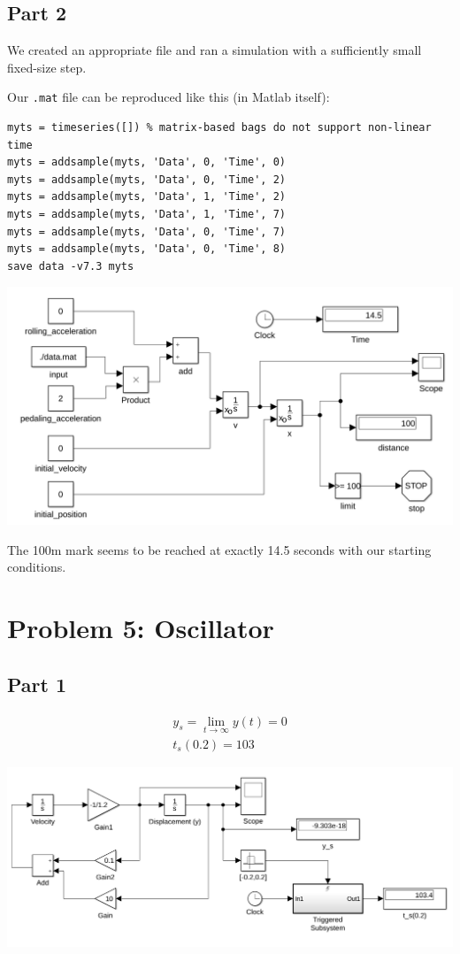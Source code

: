\documentclass[a4paper,parskip,headheight=38pt]{scrartcl} %
\begin{document}
\subsection*{Part 2}

We created an appropriate file and ran a simulation with a sufficiently
small fixed-size step.

\pagebreak{}
Our \texttt{.mat} file can be reproduced like this (in Matlab itself):
%
\vspace{-\baselineskip}\begin{verbatim}
myts = timeseries([]) % matrix-based bags do not support non-linear time
myts = addsample(myts, 'Data', 0, 'Time', 0)
myts = addsample(myts, 'Data', 0, 'Time', 2)
myts = addsample(myts, 'Data', 1, 'Time', 2)
myts = addsample(myts, 'Data', 1, 'Time', 7)
myts = addsample(myts, 'Data', 0, 'Time', 7)
myts = addsample(myts, 'Data', 0, 'Time', 8)
save data -v7.3 myts
\end{verbatim}

\includegraphics[width=\textwidth]{p4b-proof-small}

The 100m mark seems to be reached at exactly 14.5 seconds with our
starting conditions.


\section*{Problem 5: Oscillator}

\subsection*{Part 1}
\begin{align*}
y_s = \lim_{t \to \infty} y(t) = 0 \\
t_s(0.2) = 103
\end{align*}

\includegraphics[width=\textwidth]{p5a-proof-small}
\end{document}
